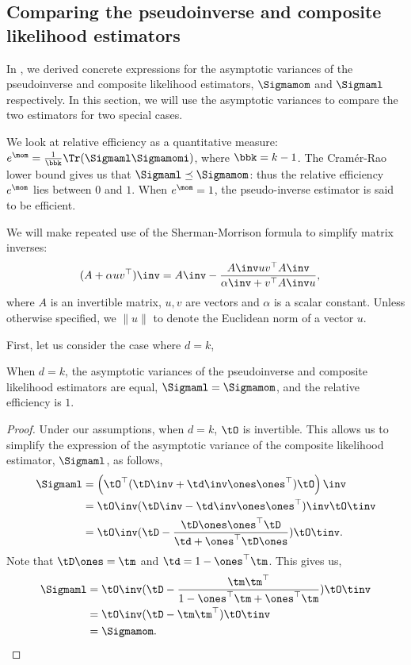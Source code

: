 \subsection{Comparing the pseudoinverse and composite likelihood estimators}
\label{app:rel-eff}

In , we derived concrete expressions for the
asymptotic variances of the pseudoinverse and composite likelihood
estimators, $\Sigmamom$ and $\Sigmaml$ respectively. 
In this section, we will use the asymptotic variances to compare the two
estimators for two special cases.

We look at relative efficiency as a quantitative measure: $e^\mom
= \frac{1}{\bbk} \Tr(\Sigmaml \Sigmamomi)$, where $\bbk = k-1$. The
Cram\'{e}r-Rao lower bound gives us that $\Sigmaml \preceq \Sigmamom$:
thus the relative efficiency $e^\mom$ lies between $0$ and $1$. When
$e^\mom = 1$, the pseudo-inverse estimator is said to be efficient.

We will make repeated use of the Sherman-Morrison formula to simplify
matrix inverses:
\begin{align*}
  (A + \alpha uv^\top)\inv &= A\inv - \frac{A\inv uv^\top A\inv}{\alpha\inv + v^\top A\inv u},
\end{align*}
where $A$ is an invertible matrix, $u, v$ are vectors and $\alpha$ is
a scalar constant. Unless otherwise specified, we $\|u\|$ to denote the
Euclidean norm of a vector $u$.

First, let us consider the case where $d = k$,
\begin{lemma}[Relative efficiency when $d = k$]
  When $d = k$, the asymptotic variances of the pseudoinverse and
  composite likelihood estimators are equal, $\Sigmaml = \Sigmamom$, and the relative efficiency
  is $1$.
\end{lemma}
\begin{proof}
Under our assumptions, when $d=k$, $\tO$ is invertible. This allows us
to simplify the expression of the asymptotic variance of the composite
likelihood estimator, $\Sigmaml$, as follows, 
\begin{align*}
    \Sigmaml 
      &= \left( \tO^\top(\tD\inv + \td\inv \ones \ones^\top) \tO \right)\inv \\
      &= \tO\inv (\tD\inv - \td\inv \ones \ones^\top)\inv \tO\tinv \\
      &= \tO\inv (\tD - \frac{\tD \ones \ones^\top \tD}{\td + \ones^\top \tD \ones}) \tO\tinv.
\end{align*}
Note that $\tD \ones = \tm$ and $\td = 1 - \ones^\top \tm$. This gives us,
\begin{align*}
    \Sigmaml 
      &= \tO\inv (\tD - \frac{\tm \tm^\top}{1 - \ones^\top \tm + \ones^\top \tm}) \tO\tinv \\
      &= \tO\inv (\tD - \tm \tm^\top) \tO\tinv \\
      &= \Sigmamom.
\end{align*}
\end{proof}


